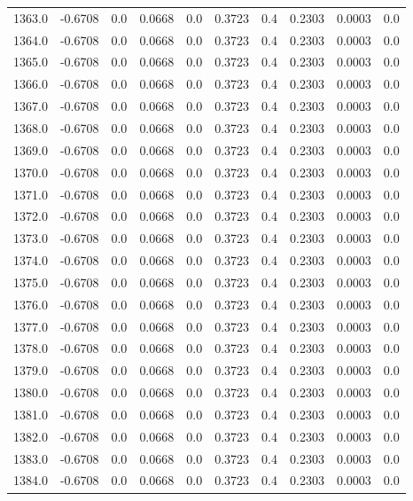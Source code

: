\begin{longtable}{lrrrrrrrrr}
1363.0 & -0.6708 & 0.0 & 0.0668 & 0.0 & 0.3723 & 0.4 & 0.2303 & 0.0003 & 0.0 \\
1364.0 & -0.6708 & 0.0 & 0.0668 & 0.0 & 0.3723 & 0.4 & 0.2303 & 0.0003 & 0.0 \\
1365.0 & -0.6708 & 0.0 & 0.0668 & 0.0 & 0.3723 & 0.4 & 0.2303 & 0.0003 & 0.0 \\
1366.0 & -0.6708 & 0.0 & 0.0668 & 0.0 & 0.3723 & 0.4 & 0.2303 & 0.0003 & 0.0 \\
1367.0 & -0.6708 & 0.0 & 0.0668 & 0.0 & 0.3723 & 0.4 & 0.2303 & 0.0003 & 0.0 \\
1368.0 & -0.6708 & 0.0 & 0.0668 & 0.0 & 0.3723 & 0.4 & 0.2303 & 0.0003 & 0.0 \\
1369.0 & -0.6708 & 0.0 & 0.0668 & 0.0 & 0.3723 & 0.4 & 0.2303 & 0.0003 & 0.0 \\
1370.0 & -0.6708 & 0.0 & 0.0668 & 0.0 & 0.3723 & 0.4 & 0.2303 & 0.0003 & 0.0 \\
1371.0 & -0.6708 & 0.0 & 0.0668 & 0.0 & 0.3723 & 0.4 & 0.2303 & 0.0003 & 0.0 \\
1372.0 & -0.6708 & 0.0 & 0.0668 & 0.0 & 0.3723 & 0.4 & 0.2303 & 0.0003 & 0.0 \\
1373.0 & -0.6708 & 0.0 & 0.0668 & 0.0 & 0.3723 & 0.4 & 0.2303 & 0.0003 & 0.0 \\
1374.0 & -0.6708 & 0.0 & 0.0668 & 0.0 & 0.3723 & 0.4 & 0.2303 & 0.0003 & 0.0 \\
1375.0 & -0.6708 & 0.0 & 0.0668 & 0.0 & 0.3723 & 0.4 & 0.2303 & 0.0003 & 0.0 \\
1376.0 & -0.6708 & 0.0 & 0.0668 & 0.0 & 0.3723 & 0.4 & 0.2303 & 0.0003 & 0.0 \\
1377.0 & -0.6708 & 0.0 & 0.0668 & 0.0 & 0.3723 & 0.4 & 0.2303 & 0.0003 & 0.0 \\
1378.0 & -0.6708 & 0.0 & 0.0668 & 0.0 & 0.3723 & 0.4 & 0.2303 & 0.0003 & 0.0 \\
1379.0 & -0.6708 & 0.0 & 0.0668 & 0.0 & 0.3723 & 0.4 & 0.2303 & 0.0003 & 0.0 \\
1380.0 & -0.6708 & 0.0 & 0.0668 & 0.0 & 0.3723 & 0.4 & 0.2303 & 0.0003 & 0.0 \\
1381.0 & -0.6708 & 0.0 & 0.0668 & 0.0 & 0.3723 & 0.4 & 0.2303 & 0.0003 & 0.0 \\
1382.0 & -0.6708 & 0.0 & 0.0668 & 0.0 & 0.3723 & 0.4 & 0.2303 & 0.0003 & 0.0 \\
1383.0 & -0.6708 & 0.0 & 0.0668 & 0.0 & 0.3723 & 0.4 & 0.2303 & 0.0003 & 0.0 \\
1384.0 & -0.6708 & 0.0 & 0.0668 & 0.0 & 0.3723 & 0.4 & 0.2303 & 0.0003 & 0.0 \\

\end{longtable}
